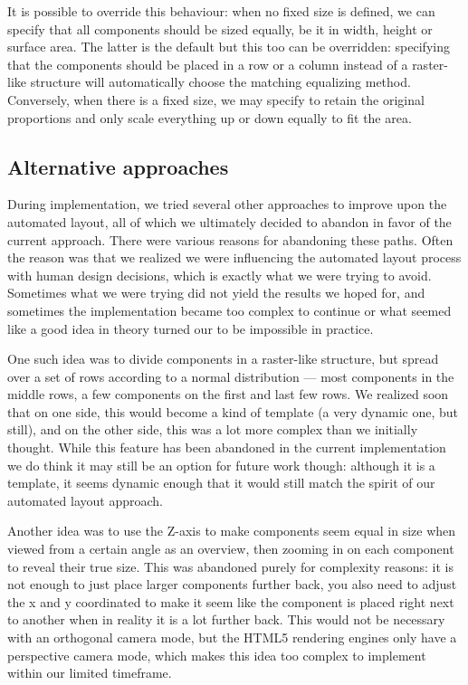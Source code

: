     It is possible to override this behaviour: when no fixed size is defined,
    we can specify that all components should be sized equally, be it in width,
    height or surface area. The latter is the default but this too can be
    overridden: specifying that the components should be placed in a row or a
    column instead of a raster-like structure will automatically choose the
    matching equalizing method. Conversely, when there is a fixed size, we may
    specify to retain the original proportions and only scale everything up or
    down equally to fit the area.
   
   \subsection{Alternative approaches}

    During implementation, we tried several other approaches to improve upon the
    automated layout, all of which we ultimately decided to abandon in favor of
    the current approach. There were various reasons for abandoning these
    paths. Often the reason was that we realized we were influencing the
    automated layout process with human design decisions, which is exactly what
    we were trying to avoid. Sometimes what we were trying did not yield the
    results we hoped for, and sometimes the implementation became too complex
    to continue or what seemed like a good idea in theory turned our to be
    impossible in practice.

    One such idea was to divide components in a raster-like structure, but
    spread over a set of rows according to a normal distribution --- most
    components in the middle rows, a few components on the first and last few
    rows. We realized soon that on one side, this would become a kind of
    template (a very dynamic one, but still), and on the other side, this was a
    lot more complex than we initially thought. While this feature has been
    abandoned in the current implementation we do think it may still be an
    option for future work though: although it is a template, it seems dynamic
    enough that it would still match the spirit of our automated layout
    approach.

    Another idea was to use the Z-axis to make components seem equal in size
    when viewed from a certain angle as an overview, then zooming in on each
    component to reveal their true size. This was abandoned purely for
    complexity reasons: it is not enough to just place larger components
    further back, you also need to adjust the x and y coordinated to make it
    seem like the component is placed right next to another when in reality it
    is a lot further back. This would not be necessary with an orthogonal
    camera mode, but the HTML5 rendering engines only have a perspective camera
    mode, which makes this idea too complex to implement within our limited
    timeframe.
